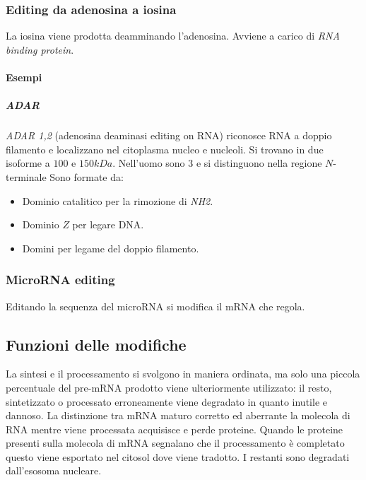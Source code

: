 		\subsubsection{Editing da adenosina a iosina}
		La iosina viene prodotta deamminando l'adenosina.
		Avviene a carico di \emph{RNA binding protein}.

			\paragraph{Esempi}

				\subparagraph{ADAR}
				\emph{ADAR 1,2} (adenosina deaminasi editing on RNA) riconosce RNA a doppio filamento e localizzano nel citoplasma nucleo e nucleoli.
				Si trovano in due isoforme a $100$ e $150kDa$.
				Nell'uomo sono $3$ e si distinguono nella regione $N$-terminale
				Sono formate da:
				\begin{multicols}{2}
					\begin{itemize}
						\item Dominio catalitico per la rimozione di \emph{NH2}.
						\item Dominio $Z$ per legare DNA.
						\item Domini per legame del doppio filamento.
					\end{itemize}
				\end{multicols}

		\subsubsection{MicroRNA editing}
		Editando la sequenza del microRNA si modifica il mRNA che regola.


	\subsection{Funzioni delle modifiche}
	La sintesi e il processamento si svolgono in maniera ordinata, ma solo una piccola percentuale del pre-mRNA prodotto viene ulteriormente utilizzato: il resto, sintetizzato o processato erroneamente viene degradato in quanto inutile e dannoso.
	La distinzione tra mRNA maturo corretto ed aberrante la molecola di RNA mentre viene processata acquisisce e perde proteine.
	Quando le proteine presenti sulla molecola di mRNA segnalano che il processamento \`e completato questo viene esportato nel citosol dove viene tradotto.
	I restanti sono degradati dall'esosoma nucleare.


